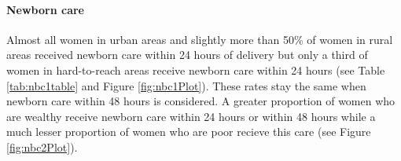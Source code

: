 \documentclass[12pt,a4paper]{article}
\let\oldparagraph\paragraph
\renewcommand{\paragraph}[1]{\oldparagraph{#1}\mbox{}}
\begin{document}
\hypertarget{nbc}{%
\paragraph{Newborn care}\label{nbc}}

Almost all women in urban areas and slightly more than 50\% of women in rural areas received newborn care within 24 hours of delivery but only a third of women in hard-to-reach areas receive newborn care within 24 hours (see Table \ref{tab:nbc1table} and Figure \ref{fig:nbc1Plot}). These rates stay the same when newborn care within 48 hours is considered. A greater proportion of women who are wealthy receive newborn care within 24 hours or within 48 hours while a much lesser proportion of women who are poor recieve this care (see Figure \ref{fig:nbc2Plot}).

\begin{table}[H]


\end{table}
\end{document}
